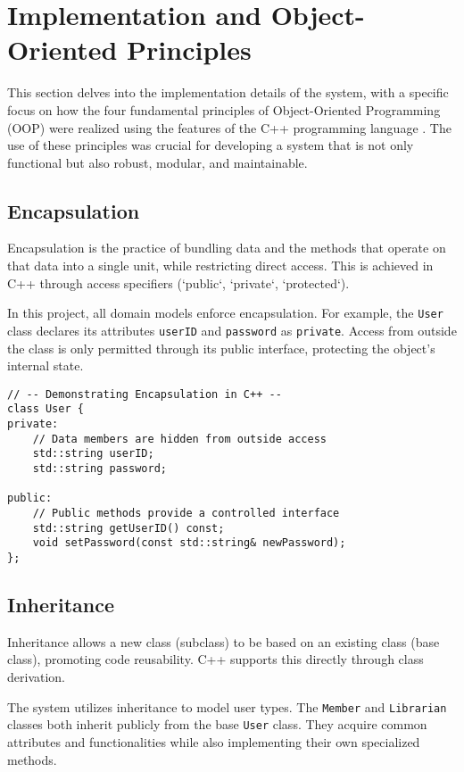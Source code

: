 \section{Implementation and Object-Oriented Principles}
\label{sec:implementation_oop}

This section delves into the implementation details of the system, with a specific focus on how the four fundamental principles of Object-Oriented Programming (OOP) \cite{Booch2007} were realized using the features of the C++ programming language \cite{Stroustrup2013}. The use of these principles was crucial for developing a system that is not only functional but also robust, modular, and maintainable.

\subsection{Encapsulation}
Encapsulation is the practice of bundling data and the methods that operate on that data into a single unit, while restricting direct access. This is achieved in C++ through access specifiers (`public`, `private`, `protected`).

In this project, all domain models enforce encapsulation. For example, the \texttt{User} class declares its attributes \texttt{userID} and \texttt{password} as \texttt{private}. Access from outside the class is only permitted through its public interface, protecting the object's internal state.

\begin{verbatim}
// -- Demonstrating Encapsulation in C++ --
class User {
private:
    // Data members are hidden from outside access
    std::string userID;
    std::string password;

public:
    // Public methods provide a controlled interface
    std::string getUserID() const;
    void setPassword(const std::string& newPassword);
};
\end{verbatim}

\subsection{Inheritance}
Inheritance allows a new class (subclass) to be based on an existing class (base class), promoting code reusability. C++ supports this directly through class derivation.

The system utilizes inheritance to model user types. The \texttt{Member} and \texttt{Librarian} classes both inherit publicly from the base \texttt{User} class. They acquire common attributes and functionalities while also implementing their own specialized methods.

